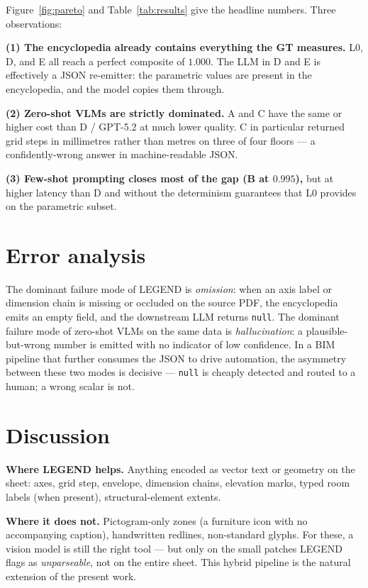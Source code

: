 \documentclass[conference]{IEEEtran}
\begin{document}
Figure~\ref{fig:pareto} and Table~\ref{tab:results} give the headline numbers.
Three observations:

\textbf{(1) The encyclopedia already contains everything the GT measures.}
L0, D, and E all reach a perfect composite of $1.000$. The LLM in D and E is
effectively a JSON re-emitter: the parametric values are present in the
encyclopedia, and the model copies them through.

\textbf{(2) Zero-shot VLMs are strictly dominated.} A and C have the same
or higher cost than D / GPT-5.2 at much lower quality. C in particular
returned grid steps in millimetres rather than metres on three of four
floors --- a confidently-wrong answer in machine-readable JSON.

\textbf{(3) Few-shot prompting closes most of the gap (B at $0.995$),} but
at higher latency than D and without the determinism guarantees that L0
provides on the parametric subset.

\section{Error analysis}
The dominant failure mode of LEGEND is \emph{omission}: when an axis label or
dimension chain is missing or occluded on the source PDF, the encyclopedia
emits an empty field, and the downstream LLM returns \texttt{null}. The
dominant failure mode of zero-shot VLMs on the same data is
\emph{hallucination}: a plausible-but-wrong number is emitted with no
indicator of low confidence. In a BIM pipeline that further consumes the JSON
to drive automation, the asymmetry between these two modes is decisive ---
\texttt{null} is cheaply detected and routed to a human; a wrong scalar is
not.

\section{Discussion}
\textbf{Where LEGEND helps.} Anything encoded as vector text or geometry on
the sheet: axes, grid step, envelope, dimension chains, elevation marks,
typed room labels (when present), structural-element extents.

\textbf{Where it does not.} Pictogram-only zones (a furniture icon with no
accompanying caption), handwritten redlines, non-standard glyphs. For these,
a vision model is still the right tool --- but only on the small patches
LEGEND flags as \emph{unparseable}, not on the entire sheet. This hybrid
pipeline is the natural extension of the present work.
\end{document}
